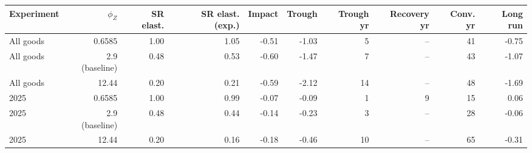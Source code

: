 \begin{tabular}{lrrrrrrrrr}
\toprule
Experiment & $\phi_Z$ & SR elast. & SR elast. (exp.) & Impact & Trough & Trough yr & Recovery yr & Conv. yr & Long run \\
\midrule
All goods & 0.6585 & 1.00 & 1.05 & -0.51 & -1.03 & 5 & -- & 41 & -0.75 \\
All goods & 2.9 (baseline) & 0.48 & 0.53 & -0.60 & -1.47 & 7 & -- & 43 & -1.07 \\
All goods & 12.44 & 0.20 & 0.21 & -0.59 & -2.12 & 14 & -- & 48 & -1.69 \\
\midrule
2025 & 0.6585 & 1.00 & 0.99 & -0.07 & -0.09 & 1 & 9 & 15 & 0.06 \\
2025 & 2.9 (baseline) & 0.48 & 0.44 & -0.14 & -0.23 & 3 & -- & 28 & -0.06 \\
2025 & 12.44 & 0.20 & 0.16 & -0.18 & -0.46 & 10 & -- & 65 & -0.31 \\
\bottomrule
\end{tabular}
